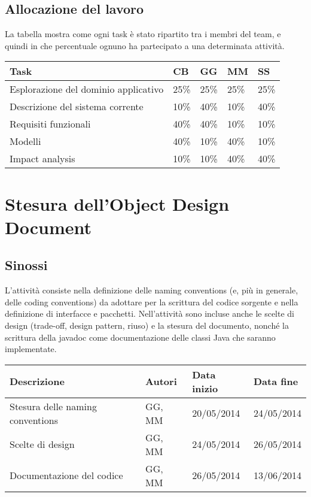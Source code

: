 \subsection{Allocazione del lavoro}
La tabella mostra come ogni task è stato ripartito tra i membri del team, e quindi in che percentuale ognuno ha partecipato a una determinata attività.
\begin{table}[ht]
 \begin{tabular}{|p{7.5cm}|p{1cm}|p{1cm}|p{1cm}|p{1cm}|}
  \hline
  \rowcolor{Gray}\textbf{Task}			& \textbf{CB}		& \textbf{GG}		& \textbf{MM}		& \textbf{SS}		\\
  \hline
  Esplorazione del dominio applicativo		& 25\%			& 25\%			& 25\%			& 25\%			\\
  \hline
  Descrizione del sistema corrente		& 10\%			& 40\%			& 10\%			& 40\%			\\
  \hline
  Requisiti funzionali				& 40\%			& 40\%			& 10\%			& 10\%			\\
  \hline
  Modelli					& 40\%			& 10\%			& 40\%			& 10\%			\\
  \hline
  Impact analysis				& 10\%			& 10\%			& 40\%			& 40\%			\\
  \hline
 \end{tabular}
\end{table}





\section{Stesura dell'Object Design Document}
\subsection{Sinossi}
L'attività consiste nella definizione delle naming conventions (e, più in generale, delle coding conventions) da adottare per la scrittura del codice sorgente e nella definizione di interfacce e pacchetti. Nell'attività sono incluse anche le scelte di design (trade-off, design pattern, riuso) e la stesura del documento, nonché la scrittura della javadoc come documentazione delle classi Java che saranno implementate.

\begin{table}[ht]
 \begin{tabular}{|p{6cm}|p{2cm}|p{2cm}|p{2cm}|}
    \hline
    \rowcolor{Gray}\textbf{Descrizione}			& \textbf{Autori}		& \textbf{Data inizio}			& \textbf{Data fine}	\\
    \hline
    Stesura delle naming conventions			& GG, MM			& 20/05/2014				& 24/05/2014		\\
    \hline
    Scelte di design					& GG, MM			& 24/05/2014				& 26/05/2014		\\
    \hline
    Documentazione del codice				& GG, MM			& 26/05/2014				& 13/06/2014		\\
    \hline
 \end{tabular}
\end{table}

